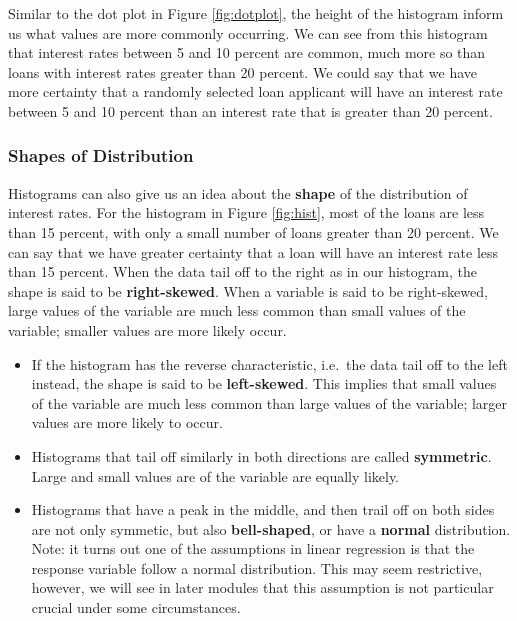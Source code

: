 \documentclass[
]{book}
\begin{document}
Similar to the dot plot in Figure \ref{fig:dotplot}, the height of the histogram inform us what values are more commonly occurring. We can see from this histogram that interest rates between 5 and 10 percent are common, much more so than loans with interest rates greater than 20 percent. We could say that we have more certainty that a randomly selected loan applicant will have an interest rate between 5 and 10 percent than an interest rate that is greater than 20 percent.

\subsubsection{Shapes of Distribution}\label{shapes-of-distribution}

Histograms can also give us an idea about the \textbf{shape} of the distribution of interest rates. For the histogram in Figure \ref{fig:hist}, most of the loans are less than 15 percent, with only a small number of loans greater than 20 percent. We can say that we have greater certainty that a loan will have an interest rate less than 15 percent. When the data tail off to the right as in our histogram, the shape is said to be \textbf{right-skewed}. When a variable is said to be right-skewed, large values of the variable are much less common than small values of the variable; smaller values are more likely occur.

\begin{itemize}
\item
  If the histogram has the reverse characteristic, i.e.~the data tail off to the left instead, the shape is said to be \textbf{left-skewed}. This implies that small values of the variable are much less common than large values of the variable; larger values are more likely to occur.
\item
  Histograms that tail off similarly in both directions are called \textbf{symmetric}. Large and small values are of the variable are equally likely.
\item
  Histograms that have a peak in the middle, and then trail off on both sides are not only symmetic, but also \textbf{bell-shaped}, or have a \textbf{normal} distribution. Note: it turns out one of the assumptions in linear regression is that the response variable follow a normal distribution. This may seem restrictive, however, we will see in later modules that this assumption is not particular crucial under some circumstances.
\end{itemize}
\end{document}
